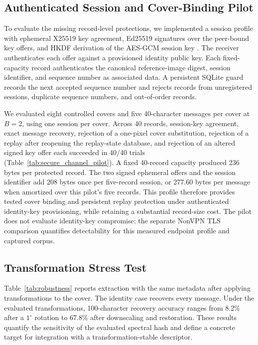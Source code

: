 \documentclass[preprint,12pt]{elsarticle}
\theoremstyle{plain}
\begin{document}
\subsection{Authenticated Session and Cover-Binding Pilot}

To evaluate the missing record-level protections, we implemented a session
profile with ephemeral X25519 key agreement, Ed25519 signatures over the
peer-bound key offers, and HKDF derivation of the AES-GCM session key
\cite{rfc7748,rfc8032,rfc5869,nist80038d}. The receiver authenticates each
offer against a provisioned identity public key. Each fixed-capacity record
authenticates the canonical reference-image digest, session identifier, and
sequence number as associated data. A persistent SQLite guard records the
next accepted sequence number and rejects records from unregistered sessions,
duplicate sequence numbers, and out-of-order records.

We evaluated eight controlled covers and five 40-character messages per
cover at $B=2$, using one session per cover. Across 40 records, session-key
agreement, exact message recovery, rejection of a one-pixel cover substitution,
rejection of a replay after reopening the replay-state database, and rejection
of an altered signed key offer each succeeded in 40/40 trials
(Table~\ref{tab:secure_channel_pilot}). A fixed 40-record capacity produced
236 bytes per protected record. The two signed ephemeral offers and the
session identifier add 208 bytes once per five-record session, or 277.60
bytes per message when amortized over this pilot's five records. This profile
therefore provides tested cover binding and persistent replay protection under
authenticated identity-key provisioning, while retaining a substantial
record-size cost. The pilot does not evaluate identity-key compromise; the
separate NonVPN TLS comparison quantifies detectability for this measured
endpoint profile and captured corpus.

\begin{table}[!t]
\centering
\small
\caption{Authenticated session, cover binding, persistent replay rejection, and communication overhead.}
\label{tab:secure_channel_pilot}

\end{table}

\subsection{Transformation Stress Test}

Table~\ref{tab:robustness} reports extraction with
the same metadata after applying transformations to the cover. The identity
case recovers every message. Under the evaluated transformations,
100-character recovery accuracy ranges from 8.2\% after a
$1^\circ$ rotation to 67.8\% after downscaling and restoration. These results
quantify the sensitivity of the evaluated spectral hash and define a concrete
target for integration with a transformation-stable descriptor.
\end{document}

